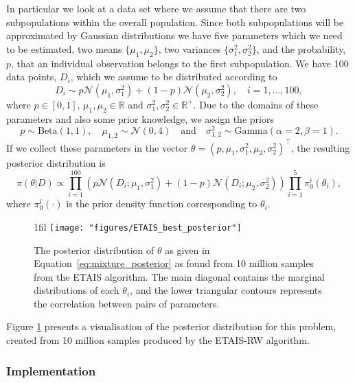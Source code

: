 \documentclass[final]{siamltex}
\makeatletter
\newcommand*{\centerfloat}{%
  \parindent \z@
  \leftskip \z@ \@plus 1fil \@minus \textwidth
  \rightskip\leftskip
  \parfillskip \z@skip}
\makeatother
\begin{document}
In particular we look at a data set where we assume that there are two
subpopulations within the overall population. Since both
subpopulations will be approximated by Gaussian distributions we have
five parameters which we need to be estimated, two means $\{\mu_{1}, \mu_{2}\}$,
two variances $\{\sigma^2_{1}, \sigma^2_{2}\}$, and the probability, $p$, that an
individual observation belongs to the first subpopulation. We have 100
data points, $D_i$, which we assume to be distributed according to
\[
	D_i \sim p\mathcal{N}(\mu_1, \sigma^2_1) + (1-p)\mathcal{N}
	(\mu_2, \sigma^2_2), \quad i = 1,\dots,100,
\]
where $p \in [0, 1]$, $\mu_{1},\mu_2 \in \mathbb{R}$ and $\sigma^2_{1},\sigma^2_2
\in \mathbb{R}^+$. Due to the domains of these parameters and also
some prior knowledge, we assign the priors
\[
	p \sim \text{Beta}(1,1), \quad \mu_{1,2} \sim \mathcal{N}(0, 4)
	 \quad \text{and} \quad \sigma^2_{1,2} \sim \text{Gamma}
	(\alpha=2, \beta=1).
\]
If we collect these parameters in the vector $\theta = (p, \mu_1,
\sigma^2_1, \mu_2, \sigma^2_2)^\top$, the resulting posterior
distribution is
\begin{equation}\label{eq:mixture_posterior}
	\pi(\theta|D) \propto \prod\limits_{i=1}^{100} (p\mathcal{N}
	(D_i;\mu_1, \sigma^2_1) + (1-p)\mathcal{N}(D_i;\mu_2, \sigma^2_2))
	\prod\limits_{i=1}^5 \pi_0^i(\theta_i),
\end{equation}
where $\pi_0^i(\cdot)$ is the prior density function corresponding to $\theta_i$.

\begin{figure}[htb]
\centerfloat
\texttt{[image: "figures/ETAIS\_best\_posterior"]}
\caption{The posterior distribution of $\theta$ as given in
Equation~\eqref{eq:mixture_posterior} as found from 10 million samples
from the ETAIS algorithm. The main diagonal contains the marginal
distributions of each $\theta_i$, and the lower triangular contours
represents the correlation between pairs of parameters.}
\label{fig:mixture_posterior}
\end{figure}

Figure \ref{fig:mixture_posterior} presents a visualisation of the
posterior distribution for this problem, created from 10 million
samples produced by the ETAIS-RW algorithm.


\subsubsection{Implementation}
\label{sec:mixture_implementation}
\end{document}
